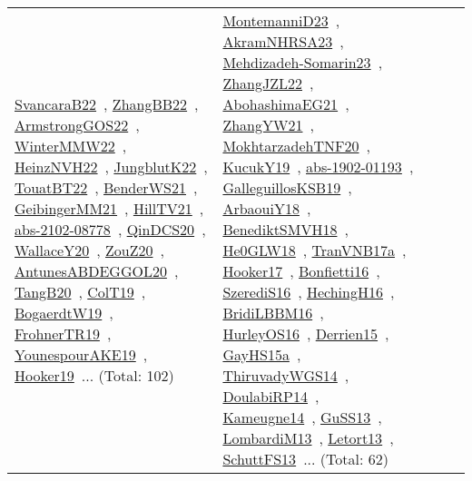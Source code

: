 {\begin{longtable}{lp{3cm}>{\raggedright\arraybackslash}p{6cm}>{\raggedright\arraybackslash}p{6cm}>{\raggedright\arraybackslash}p{8cm}}
\href{works/SvancaraB22.pdf}{SvancaraB22}~\cite{SvancaraB22}, \href{works/ZhangBB22.pdf}{ZhangBB22}~\cite{ZhangBB22}, \href{works/ArmstrongGOS22.pdf}{ArmstrongGOS22}~\cite{ArmstrongGOS22}, \href{works/WinterMMW22.pdf}{WinterMMW22}~\cite{WinterMMW22}, \href{works/HeinzNVH22.pdf}{HeinzNVH22}~\cite{HeinzNVH22}, \href{works/JungblutK22.pdf}{JungblutK22}~\cite{JungblutK22}, \href{works/TouatBT22.pdf}{TouatBT22}~\cite{TouatBT22}, \href{works/BenderWS21.pdf}{BenderWS21}~\cite{BenderWS21}, \href{works/GeibingerMM21.pdf}{GeibingerMM21}~\cite{GeibingerMM21}, \href{works/HillTV21.pdf}{HillTV21}~\cite{HillTV21}, \href{works/abs-2102-08778.pdf}{abs-2102-08778}~\cite{abs-2102-08778}, \href{works/QinDCS20.pdf}{QinDCS20}~\cite{QinDCS20}, \href{works/WallaceY20.pdf}{WallaceY20}~\cite{WallaceY20}, \href{works/ZouZ20.pdf}{ZouZ20}~\cite{ZouZ20}, \href{works/AntunesABDEGGOL20.pdf}{AntunesABDEGGOL20}~\cite{AntunesABDEGGOL20}, \href{works/TangB20.pdf}{TangB20}~\cite{TangB20}, \href{works/ColT19.pdf}{ColT19}~\cite{ColT19}, \href{works/BogaerdtW19.pdf}{BogaerdtW19}~\cite{BogaerdtW19}, \href{works/FrohnerTR19.pdf}{FrohnerTR19}~\cite{FrohnerTR19}, \href{works/YounespourAKE19.pdf}{YounespourAKE19}~\cite{YounespourAKE19}, \href{works/Hooker19.pdf}{Hooker19}~\cite{Hooker19}... (Total: 102) & \href{works/MontemanniD23.pdf}{MontemanniD23}~\cite{MontemanniD23}, \href{works/AkramNHRSA23.pdf}{AkramNHRSA23}~\cite{AkramNHRSA23}, \href{works/Mehdizadeh-Somarin23.pdf}{Mehdizadeh-Somarin23}~\cite{Mehdizadeh-Somarin23}, \href{works/ZhangJZL22.pdf}{ZhangJZL22}~\cite{ZhangJZL22}, \href{works/AbohashimaEG21.pdf}{AbohashimaEG21}~\cite{AbohashimaEG21}, \href{works/ZhangYW21.pdf}{ZhangYW21}~\cite{ZhangYW21}, \href{works/MokhtarzadehTNF20.pdf}{MokhtarzadehTNF20}~\cite{MokhtarzadehTNF20}, \href{works/KucukY19.pdf}{KucukY19}~\cite{KucukY19}, \href{works/abs-1902-01193.pdf}{abs-1902-01193}~\cite{abs-1902-01193}, \href{works/GalleguillosKSB19.pdf}{GalleguillosKSB19}~\cite{GalleguillosKSB19}, \href{works/ArbaouiY18.pdf}{ArbaouiY18}~\cite{ArbaouiY18}, \href{works/BenediktSMVH18.pdf}{BenediktSMVH18}~\cite{BenediktSMVH18}, \href{works/He0GLW18.pdf}{He0GLW18}~\cite{He0GLW18}, \href{works/TranVNB17a.pdf}{TranVNB17a}~\cite{TranVNB17a}, \href{works/Hooker17.pdf}{Hooker17}~\cite{Hooker17}, \href{works/Bonfietti16.pdf}{Bonfietti16}~\cite{Bonfietti16}, \href{works/SzerediS16.pdf}{SzerediS16}~\cite{SzerediS16}, \href{works/HechingH16.pdf}{HechingH16}~\cite{HechingH16}, \href{works/BridiLBBM16.pdf}{BridiLBBM16}~\cite{BridiLBBM16}, \href{works/HurleyOS16.pdf}{HurleyOS16}~\cite{HurleyOS16}, \href{works/Derrien15.pdf}{Derrien15}~\cite{Derrien15}, \href{works/GayHS15a.pdf}{GayHS15a}~\cite{GayHS15a}, \href{works/ThiruvadyWGS14.pdf}{ThiruvadyWGS14}~\cite{ThiruvadyWGS14}, \href{works/DoulabiRP14.pdf}{DoulabiRP14}~\cite{DoulabiRP14}, \href{works/Kameugne14.pdf}{Kameugne14}~\cite{Kameugne14}, \href{works/GuSS13.pdf}{GuSS13}~\cite{GuSS13}, \href{works/LombardiM13.pdf}{LombardiM13}~\cite{LombardiM13}, \href{works/Letort13.pdf}{Letort13}~\cite{Letort13}, \href{works/SchuttFS13.pdf}{SchuttFS13}~\cite{SchuttFS13}... (Total: 62)\\

\end{longtable}}
